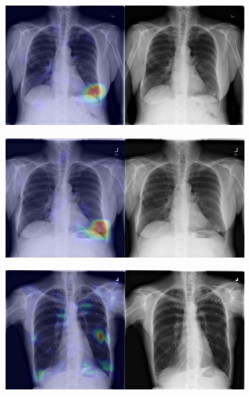 \begin{figure}[b]
    \centering
    \begin{subfigure}{0.4\textwidth}
        \centering
        \includegraphics[width=1.0\textwidth]{Chapters/5. Conclusiones/img/Nodule/1_1_00000370_000.png}
    \end{subfigure}
    \begin{subfigure}{0.4\textwidth}
        \centering
        \includegraphics[width=1.0\textwidth]{Chapters/5. Conclusiones/img/Nodule/1_1_00000370_008.png}
    \end{subfigure}
    \begin{subfigure}{0.4\textwidth}
        \centering
        \includegraphics[width=1.0\textwidth]{Chapters/5. Conclusiones/img/Nodule/1_1_00001093_013.png}

\end{subfigure}
\end{figure}
